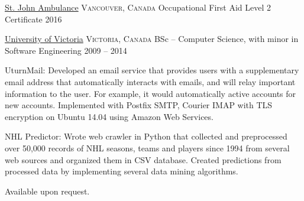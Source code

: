 \documentclass[10pt,a4paper]{article}
\begin{document}
\headedsection
  {\href{https://www.sja.ca}{St. John Ambulance}}
  {\textsc{Vancouver, Canada}} {
  \headedsubsection
    {{Occupational First Aid Level 2 Certificate}}
    {2016}
    {}
}

\vspace{1em}
\spacedhrule{0em}{-0.4em}


\headedsection
  {\href{https://www.uvic.ca/}{University of Victoria}}
  {\textsc{Victoria, Canada}} {
  \headedsubsection
    {BSc -- Computer Science, with minor in Software Engineering}
    {2009 -- 2014}
    {}
}

\vspace{1em}
\spacedhrule{0em}{-0.4em}

\inlineheadsection
  {UturnMail:}
  {Developed an email service that provides users with a supplementary
email address that automatically interacts with emails, and will relay important information to the user. For example, it would automatically active accounts for new accounts.
Implemented with Postfix SMTP, Courier IMAP with TLS encryption on Ubuntu 14.04 using Amazon Web Services.}

\vspace{0.5em}
\inlineheadsection
  {NHL Predictor:}
  {Wrote web crawler in Python that collected and preprocessed over
50,000 records of NHL seasons, teams and players since 1994 from several web sources and organized them
in CSV database. Created predictions from processed data by implementing several data mining algorithms.}

\vspace{1em}
\spacedhrule{0em}{-0.4em}


\inlineheadsection
  {Available upon request.}
\end{document}
